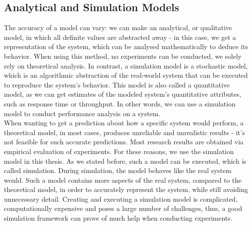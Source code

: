 \subsection{Analytical and Simulation Models}
The accuracy of a model can vary: we can make an analytical, or
qualitative model, in which all definite values are abstracted away -
in this case, we get a representation of
the system, which can be analysed mathematically to deduce its
behavior. When using this method, no experiments can be conducted, we
solely rely on theoretical analysis. In contrast, a simulation model
is a stochastic model, which is an algorithmic abstraction of the
real-world system that can be executed to reproduce the system's
behavior. This model is also called a quantitative model, as we can
get estimates of the modeled system's quantitative attributes, such as
response time or throughput. In other words, we can use a simulation
model to conduct performance analysis on a
system.\cite{h12_1}\cite{h12_13}\\
When wanting to get a prediction about how a specific system would
perform, a theoretical model, in most cases, produces unreliable and
unrealistic results - it's not feasible for such accurate
predictions. Most research results are obtained via empirical
evaluation of experiments.\cite{clq08} For these reasons, we use the
simulation model in this thesis. As we stated before, such a model can
be executed, which is called simulation. During simulation, the model
behaves like the real system would. Such a model contains more aspects
of the real system, compared to the theoretical model, in order to
accurately represent the system, while still avoiding unnecessary
detail.\cite{h12_1} Creating and executing a simulation model is
complicated, computationally expensive and poses a large number of
challenges, thus, a good simulation framework can prove of much help
when conducting experiments.
